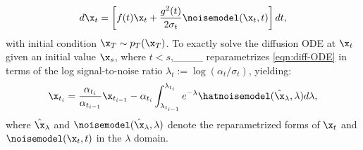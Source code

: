 \begin{equation}
    \label{eqn:diff-ODE}
    d\x_t = \left[f(t)\x_t + \frac{g^2(t)}{2\sigma_t}\noisemodel(\x_t,t)\right]dt,
\end{equation}
with initial condition $\x_T\sim p_T(\x_T)$.
To exactly solve the diffusion ODE at $\x_t$ given an initial value $\x_s$, where $ t<s$,____ reparametrizes \eqref{eqn:diff-ODE} in terms of the log signal-to-noise ratio $\lambda_t := \log(\alpha_t/\sigma_t)$, yielding:
\begin{equation}
\label{eqn:lambda-exact-soln}
\x_{t_i}=\frac{\alpha_{t_i}}{\alpha_{t_{i-1}}}\x_{t_{i-1}} - \alpha_{t_i}\int_{\lambda_{t_{i-1}}}^{\lambda_{t_i}} e^{-\lambda} \hatnoisemodel(\hat\x_\lambda,\lambda)d\lambda,
\end{equation}
where $\hat\x_\lambda$ and $\noisemodel(\hat\x_\lambda,\lambda)$ denote the reparametrized forms of $\x_t$ and $\noisemodel(\x_t,t)$ in the $\lambda$ domain.

